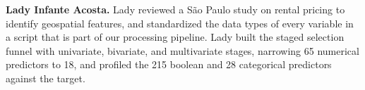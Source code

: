 \textbf{Lady Infante Acosta.} Lady reviewed a São Paulo study on rental pricing to identify
geospatial features, and standardized the data types of every variable in a script that is part of
our processing pipeline. Lady built the staged selection funnel with univariate, bivariate, and
multivariate stages, narrowing 65 numerical predictors to 18, and profiled the 215 boolean and 28
categorical predictors against the target. 
